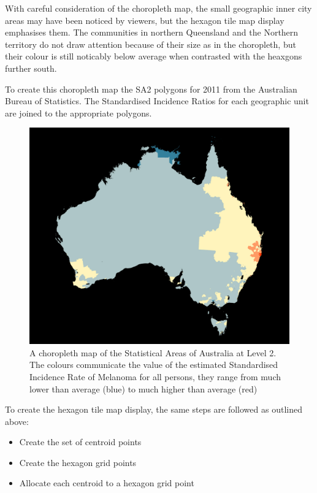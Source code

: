 \documentclass[
]{jss}
\providecommand{\tightlist}{%
  \setlength{\itemsep}{0pt}\setlength{\parskip}{0pt}}
\begin{document}
With careful consideration of the choropleth map, the small geographic
inner city areas may have been noticed by viewers, but the hexagon tile
map display emphasises them. The communities in northern Queensland and
the Northern territory do not draw attention because of their size as in
the choropleth, but their colour is still noticably below average when
contrasted with the heaxgons further south.

To create this choropleth map the SA2 polygons for 2011 from the
Australian Bureau of Statistics. The Standardised Incidence Ratios for
each geographic unit are joined to the appropriate polygons.

\begin{figure}

{\centering \includegraphics[width=0.6\linewidth]{figures/aus_melanoma_p} 

}

\caption[A choropleth map of the Statistical Areas of Australia at Level 2]{A choropleth map of the Statistical Areas of Australia at Level 2. The colours communicate the value of the estimated Standardised Incidence Rate of Melanoma for all persons, they range from much lower than average (blue) to much higher than average (red)}\label{fig:melanoma-geo}
\end{figure}

To create the hexagon tile map display, the same steps are followed as
outlined above:

\begin{itemize}
\tightlist
\item
  Create the set of centroid points
\item
  Create the hexagon grid points
\item
  Allocate each centroid to a hexagon grid point
\end{itemize}
\end{document}
